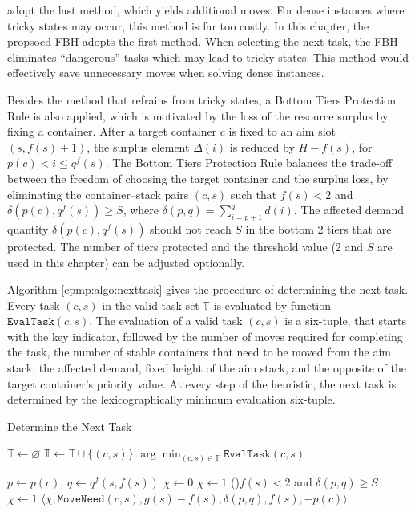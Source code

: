\documentclass{article}
\begin{document}
\cite{Wang201567} adopt the last method, which yields additional moves. For dense instances where tricky states may occur, this method is far too costly.
In this chapter, the propsoed FBH adopts the first method. When selecting the next task, the FBH eliminates ``dangerous'' tasks which may lead to tricky states. This method would effectively save unnecessary moves when solving dense instances.


Besides the method that refrains from tricky states, a Bottom Tiers Protection Rule is also applied, which is motivated by the loss of the resource surplus by fixing a container.
After a target container $c$ is fixed to an aim slot $(s,f(s)+1)$, the surplus element $\Delta(i)$ is reduced by $H-f(s)$, for $p(c)< i\le q^f(s)$.
The Bottom Tiers Protection Rule balances the trade-off between the freedom of choosing the target container and the surplus loss, by eliminating the container--stack pairs $(c,s)$ such that $f(s)<2$ and $\delta(p(c),q^f(s))\ge S$, where $\delta(p,q)=\sum_{i=p+1}^{q}d(i)$. The affected demand quantity $\delta(p(c),q^f(s))$ should not reach $S$ in the bottom 2 tiers that are protected.
The number of tiers protected and the threshold value (2 and $S$ are used in this chapter) can be adjusted optionally.

Algorithm \ref{cpmp:algo:nexttask} gives the procedure of determining the next task. 
Every task $(c,s)$ in the valid task set  $\mathbb{T}$ is evaluated by function $\mathtt{EvalTask}(c,s)$. The evaluation of a valid task $(c,s)$ is a six-tuple, that starts with the key indicator, followed by the number of moves required for completing the task, the number of stable containers that need to be moved from the aim stack, the affected demand, fixed height of the aim stack, and the opposite of the target container's priority value. 
At every step of the heuristic, the next task is determined by the lexicographically minimum evaluation six-tuple. 

\begin{algorithm}[htbp]
\caption{Determine the Next Task}
\label{cpmp:algo:nexttask}

{
  $\mathbb{T}\gets \varnothing$\;
  {
      {
        $\mathbb{T}\gets \mathbb{T}\cup\{(c,s)\}$\;
      }
  }
  \Return $\arg\min_{(c,s)\in\mathbb{T}} \mathtt{EvalTask}(c,s)$\;
}

{
  $p\gets p(c)$, $q\gets q^f(s,f(s))$\;
  $\chi\gets 0$ 
  {
    $\chi\gets 1$\;
  }
  \If(){$f(s)<2$ and $\delta(p,q)\ge S$}
  {
    $\chi\gets 1$\;
  }
  \Return $\langle\chi,\mathtt{MoveNeed}(c,s),g(s)-f(s),\delta(p,q),f(s),-p(c)\rangle$\;
}

\end{algorithm}
\end{document}
